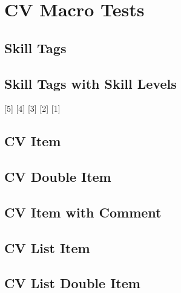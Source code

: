 \documentclass[11pt,letterpaper,sans]{moderncv}
\newcommand*{\Cplusplus}{C{}\texttt{++}}
\begin{document}
\section{CV Macro Tests}
\label{sec:orgb25d0b6}


\subsection{Skill Tags}
\label{sec:org5d6b4e4}
  


\subsection{Skill Tags with Skill Levels}
\label{sec:org160d06d}
[5] [4] [3] \cvtag{\Cplusplus}[2] [1]


\subsection{CV Item}
\label{sec:orgce5bba9}


\subsection{CV Double Item}
\label{sec:orgfd042ec}


\subsection{CV Item with Comment}
\label{sec:org5b11711}


\subsection{CV List Item}
\label{sec:org4cf0fea}


\subsection{CV List Double Item}
\label{sec:orgc7b5e37}
\end{document}
